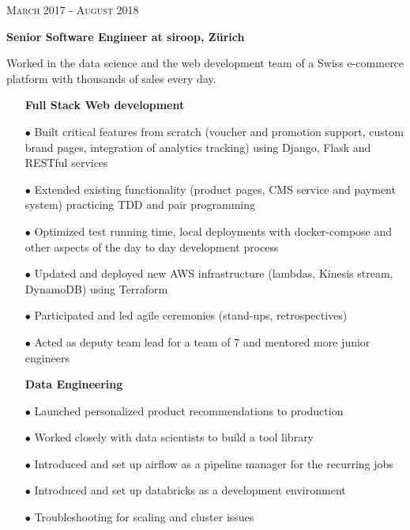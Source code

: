 \documentclass[9pt]{article} %
\begin{document}
\begin{minipage}[t]{0.5\textwidth}
{\raggedleft\textsc{March 2017 - August 2018}\par}

{\raggedright\large \textbf{Senior Software Engineer at siroop, Z\"urich}\\
}

\normalsize{Worked in the data science and the web development team of a Swiss e-commerce platform with thousands of sales every day.}
\begin{itemize}
\item[] \textbf{Full Stack Web development}
\item[$\bullet$] Built critical features from scratch (voucher and promotion support, custom brand pages, integration of analytics tracking) using Django, Flask and RESTful services
\item[$\bullet$] Extended existing functionality (product pages, CMS service and payment system) practicing TDD and pair programming
\item[$\bullet$] Optimized test running time, local deployments with docker-compose and other aspects of the day to day development process
\item[$\bullet$] Updated and deployed new AWS infrastructure (lambdas, Kinesis stream, DynamoDB) using Terraform
\item[$\bullet$] Participated and led agile ceremonies (stand-ups, retrospectives)
\item[$\bullet$] Acted as deputy team lead for a team of 7 and mentored more junior engineers
\end{itemize}

\begin{itemize}
\item[] \textbf{Data Engineering}
\item[$\bullet$] Launched personalized product recommendations to production
\item[$\bullet$] Worked closely with data scientists to build a tool library
\item[$\bullet$] Introduced and set up airflow as a pipeline manager for the recurring jobs
\item[$\bullet$] Introduced and set up databricks as a development environment
\item[$\bullet$] Troubleshooting for scaling and cluster issues
\end{itemize}





\end{minipage}
\end{document}
